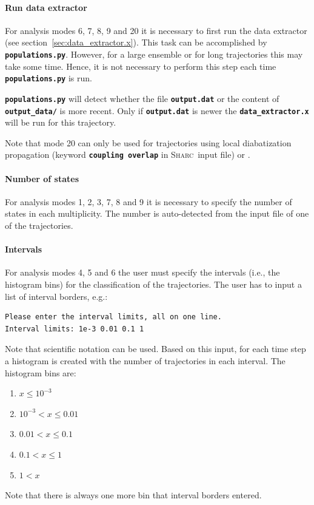 \documentclass[a4paper,10pt,DIV=15,openany,twoside=false]{scrbook}
\newcommand{\sharc}{\textsc{Sharc}}
\newcommand{\ttt}[1]{\textbf{\texttt{#1}}}
\newenvironment{example}{
  \setlength{\OuterFrameSep}{3pt}
  \vspace{0mm}
  \definecolor{shadecolor}{HTML}{E4F4FF}
  \begin{shaded}
}{
  \end{shaded}
}
\begin{document}
\paragraph{Run data extractor}

For analysis modes 6, 7, 8, 9 and 20 it is necessary to first run the data extractor (see section~\ref{sec:data_extractor.x}). This task can be accomplished by \ttt{populations.py}. However, for a large ensemble or for long trajectories this may take some time. Hence, it is not necessary to perform this step each time \ttt{populations.py} is run. 

\ttt{populations.py} will detect whether the file \ttt{output.dat} or the content of \ttt{output\_data/} is more recent. Only if \ttt{output.dat} is newer the \ttt{data\_extractor.x} will be run for this trajectory.

Note that mode 20 can only be used for trajectories using local diabatization propagation (keyword \ttt{coupling overlap} in \sharc\ input file) or .

\paragraph{Number of states}

For analysis modes 1, 2, 3, 7, 8 and 9 it is necessary to specify the number of states in each multiplicity. The number is auto-detected from the input file of one of the trajectories.

\paragraph{Intervals}

For analysis modes 4, 5 and 6 the user must specify the intervals (i.e., the histogram bins) for the classification of the trajectories. The user has to input a list of interval borders, e.g.:
\begin{example}
\begin{verbatim}
Please enter the interval limits, all on one line.
Interval limits: 1e-3 0.01 0.1 1
\end{verbatim}
\end{example}

Note that scientific notation can be used. Based on this input, for each time step a histogram is created with the number of trajectories in each interval. The histogram bins are:
\begin{enumerate}
  \item $x\leq10^{-3}$
  \item $10^{-3}<x\leq0.01$
  \item $0.01<x\leq0.1$
  \item $0.1<x\leq1$
  \item $1<x$
\end{enumerate}
Note that there is always one more bin that interval borders entered.
\end{document}
